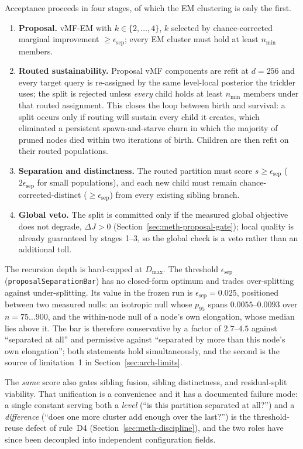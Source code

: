Acceptance proceeds in four stages, of which the EM clustering is
only the first.
\begin{enumerate}
\item \textbf{Proposal.} vMF-EM with $k \in \{2, \ldots, 4\}$,
$k$ selected by chance-corrected marginal improvement
$\geq \epsilon_{\text{sep}}$; every EM cluster must hold at least
$n_{\min}$ members.
\item \textbf{Routed sustainability.} Proposal vMF components are
refit at $d = 256$ and every target query is re-assigned by the same
level-local posterior the trickler uses; the split is rejected unless
\emph{every} child holds at least $n_{\min}$ members under that
routed assignment.
This closes the loop between birth and survival: a split occurs only
if routing will sustain every child it creates, which eliminated a
persistent spawn-and-starve churn in which the majority of pruned
nodes died within two iterations of birth.
Children are then refit on their routed populations.
\item \textbf{Separation and distinctness.} The routed partition
must score $s \geq \epsilon_{\text{sep}}$ ($2\epsilon_{\text{sep}}$
for small populations), and each new child must remain
chance-corrected-distinct ($\geq \epsilon_{\text{sep}}$) from every
existing sibling branch.
\item \textbf{Global veto.} The split is committed only if the
measured global objective does not degrade, $\Delta J > 0$
(Section~\ref{sec:meth-proposal-gate}); local quality is already
guaranteed by stages 1--3, so the global check is a veto rather than
an additional toll.
\end{enumerate}
The recursion depth is hard-capped at $D_{\max}$.
The threshold $\epsilon_{\text{sep}}$ (\texttt{proposalSeparationBar})
has no closed-form optimum and
trades over-splitting against under-splitting. Its value in the frozen
run is $\epsilon_{\text{sep}} = 0.025$, positioned between two measured
nulls: an isotropic null whose $p_{95}$ spans $0.0055$--$0.0093$ over
$n = 75\ldots900$, and the within-node null of a node's own elongation,
whose median lies above it. The bar is therefore conservative by a
factor of $2.7$--$4.5$ against ``separated at all'' and permissive
against ``separated by more than this node's own elongation'';
both statements hold simultaneously, and the second is the source of
limitation~1 in Section~\ref{sec:arch-limits}.

The \emph{same} score also gates sibling fusion, sibling distinctness,
and residual-split viability. That unification is a convenience and it
has a documented failure mode: a single constant serving both a
\emph{level} (``is this partition separated at all?'') and a
\emph{difference} (``does one more cluster add enough over the last?'')
is the threshold-reuse defect of rule~D4
(Section~\ref{sec:meth-discipline}), and the two roles have since been
decoupled into independent configuration fields.


